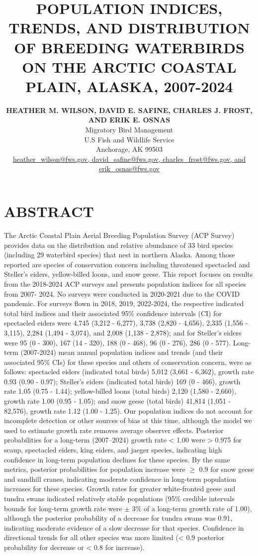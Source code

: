\documentclass[
]{article}
\title{POPULATION INDICES, TRENDS, AND DISTRIBUTION OF BREEDING
WATERBIRDS ON THE ARCTIC COASTAL PLAIN, ALASKA, 2007-2024}
\author{\textbf{HEATHER M. WILSON, DAVID E. SAFINE, CHARLES J. FROST,
AND ERIK E. OSNAS}\\Migratory Bird Management\\U.S Fish and Wildlife
Service\\Anchorage, AK 99503\\\href{mailto:heather\_wilson@fws.gov,
david\_safine@fws.gov, charles\_frost@fws.gov, and
erik\_osnas@fws.gov}{heather\_wilson@fws.gov, david\_safine@fws.gov,
charles\_frost@fws.gov, and erik\_osnas@fws.gov}}
\date{}
\begin{document}
\maketitle


\section*{ABSTRACT}\label{abstract}

The Arctic Coastal Plain Aerial Breeding Population Survey (ACP Survey)
provides data on the distribution and relative abundance of 33 bird
species (including 29 waterbird species) that nest in northern Alaska.
Among those reported are species of conservation concern including
threatened spectacled and Steller's eiders, yellow-billed loons, and
snow geese. This report focuses on results from the 2018-2024 ACP
surveys and presents population indices for all species from 2007- 2024.
No surveys were conducted in 2020-2021 due to the COVID pandemic. For
surveys flown in 2018, 2019, 2022-2024, the respective indicated total
bird indices and their associated 95\% confidence intervals (CI) for
spectacled eiders were 4,745 (3,212 - 6,277), 3,738 (2,820 - 4,656),
2,335 (1,556 - 3,115), 2,284 (1,494 - 3,074), and 2,008 (1,138 - 2,878);
and for Steller's eiders were 95 (0 - 300), 167 (14 - 320), 188 (0 -
468), 96 (0 - 276), 286 (0 - 577). Long-term (2007-2024) mean annual
population indices and trends (and their associated 95\% CIs) for these
species and others of conservation concern, were as follows: spectacled
eiders (indicated total birds) 5,012 (3,661 - 6,362), growth rate 0.93
(0.90 - 0.97); Steller's eiders (indicated total birds) 169 (0 - 466),
growth rate 1.05 (0.75 - 1.44); yellow-billed loons (total birds) 2,120
(1,580 - 2,660), growth rate 1.00 (0.95 - 1.05); and snow geese (total
birds) 41,814 (1,051 - 82,576), growth rate 1.12 (1.00 - 1.25). Our
population indices do not account for incomplete detection or other
sources of bias at this time, although the model we used to estimate
growth rate removes average observer effects. Posterior probabilities
for a long-term (2007--2024) growth rate \textless{} 1.00 were
\textgreater{} 0.975 for scaup, spectacled eiders, king eiders, and
jaeger species, indicating high confidence in long-term population
declines for these species. By the same metrics, posterior probabilities
for population increase were \(\geq\) 0.9 for snow geese and sandhill
cranes, indicating moderate confidence in long-term population increases
for these species. Growth rates for greater white-fronted geese and
tundra swans indicated relatively stable populations (95\% credible
intervals bounds for long-term growth rate were \(\pm\) 3\% of a
long-term growth rate of 1.00), although the posterior probability of a
decrease for tundra swans was 0.91, indicating moderate evidence of a
slow decrease for that species. Confidence in directional trends for all
other species was more limited (\textless{} 0.9 posterior probability
for decrease or \textless{} 0.8 for increase). \newline
\end{document}
